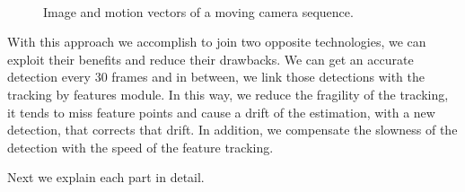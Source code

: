 \begin{figure}[H]
		
\centering

\\
\caption{Image and motion vectors of a moving camera sequence.}
\label{motion3}
\end{figure}




With this approach we accomplish to join two opposite technologies, we can exploit their benefits and reduce their drawbacks. We can get an accurate detection every $30$ frames and in between, we link those detections with the tracking by features module. In this way, we reduce the fragility of the tracking, it tends to miss feature points and cause a drift of the estimation, with a new detection, that corrects that drift. In addition, we compensate the slowness of the detection with the speed of the feature tracking.



Next we explain each part in detail.

